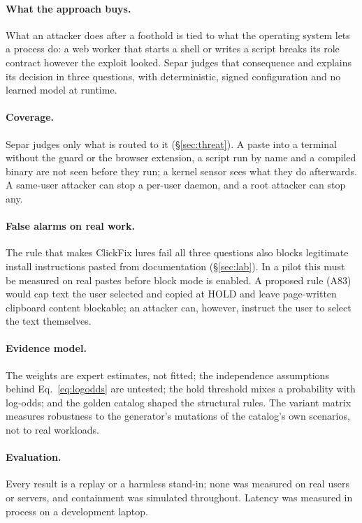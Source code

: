 \documentclass[10pt,twocolumn,letterpaper]{article}
\begin{document}
\paragraph{What the approach buys.} What an attacker does after a foothold is tied to what the
operating system lets a process do: a web worker that starts a shell or writes a script breaks
its role contract however the exploit looked. Separ judges that consequence and explains its
decision in three questions, with deterministic, signed configuration and no learned model at
runtime.

\paragraph{Coverage.} Separ judges only what is routed to it (\S\ref{sec:threat}). A paste into a
terminal without the guard or the browser extension, a script run by name and a compiled binary
are not seen before they run; a kernel sensor sees what they do afterwards. A same-user attacker
can stop a per-user daemon, and a root attacker can stop any.

\paragraph{False alarms on real work.} The rule that makes ClickFix lures fail all three questions
also blocks legitimate install instructions pasted from documentation (\S\ref{sec:lab}). In a pilot
this must be measured on real pastes before block mode is enabled. A proposed rule (A83) would cap
text the user selected and copied at HOLD and leave page-written clipboard content blockable; an
attacker can, however, instruct the user to select the text themselves.

\paragraph{Evidence model.} The weights are expert estimates, not fitted; the independence
assumptions behind Eq.~\ref{eq:logodds} are untested; the hold threshold mixes a probability with
log-odds; and the golden catalog shaped the structural rules. The variant matrix measures
robustness to the generator's mutations of the catalog's own scenarios, not to real workloads.

\paragraph{Evaluation.} Every result is a replay or a harmless stand-in; none was measured on real
users or servers, and containment was simulated throughout. Latency was measured in process on a
development laptop.
\end{document}
